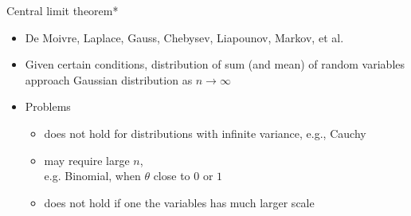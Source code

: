 \documentclass[english,t]{beamer}
\begin{document}

\begin{frame}{Central limit theorem*}

  \begin{itemize}
  \item De Moivre, Laplace, Gauss, Chebysev, Liapounov, Markov, et al.
  \item Given certain conditions, distribution of sum (and mean) of
    random variables approach Gaussian distribution as
    $n \rightarrow \infty$
  \item Problems
    \begin{itemize}
    \item does not hold for distributions with infinite variance,
      e.g., Cauchy
    \item<2-> may require large $n$,\\ e.g.
      Binomial, when $\theta$ close to $0$ or $1$
    \item<3-> does not hold if one the variables has much larger scale
    \end{itemize}
  \end{itemize}

\end{frame}


\end{document}
